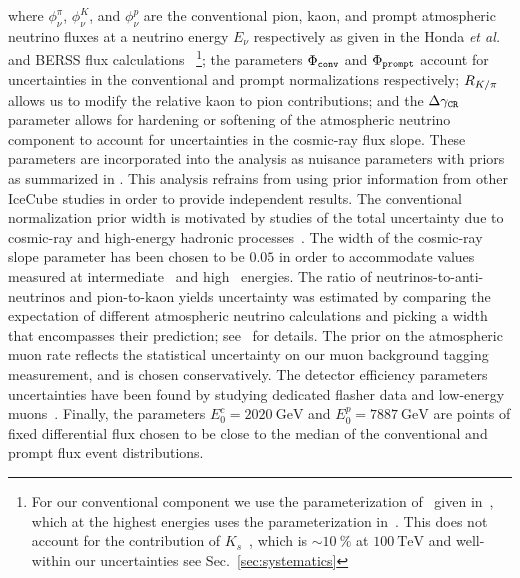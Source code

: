 where $\phi^\pi_\nu$, $\phi^K_\nu$, and $\phi^p_\nu$ are the conventional pion, kaon, and prompt atmospheric neutrino fluxes at a neutrino energy $E_\nu$ respectively as given in the Honda {\it{}et al.} and BERSS flux calculations~\cite{Honda:2006qj,Bhattacharya:2015jpa}
\footnote{For our conventional component we use the parameterization of~\cite{Honda:2006qj} given in~\cite{Montaruli:2011as}, which at the highest energies uses the parameterization in~\cite{Gaisser:2002jj}.
	This does not account for the contribution of $K_s$~\cite{Gaisser:2014pda}, which is $\sim \SI{10}\percent$ at $\SI{100}\TeV$ and well-within our uncertainties see Sec.~\ref{sec:systematics}};
the parameters $\Phi_\texttt{conv}$ and $\Phi_\texttt{prompt}$ account for uncertainties in the conventional and prompt normalizations respectively; $R_{K/\pi}$ allows us to modify the relative kaon to pion contributions; and the $\Delta\gamma_\texttt{CR}$ parameter allows for hardening or softening of the atmospheric neutrino component to account for uncertainties in the cosmic-ray flux slope.
These parameters are incorporated into the analysis as nuisance parameters with priors as summarized in .
This analysis refrains from using prior information from other IceCube studies in order to provide independent results.
The conventional normalization prior width is motivated by studies of the total uncertainty due to cosmic-ray and high-energy hadronic processes~\cite{Fedynitch:2012fs}.
The width of the cosmic-ray slope parameter has been chosen to be $0.05$ in order to accommodate values measured at intermediate~\cite{Karelin:2011zz} and high~\cite{Bartoli:2015fhw,Yoon:2017qjx,Alfaro:2017cwx} energies.
The ratio of neutrinos-to-anti-neutrinos and pion-to-kaon yields uncertainty was estimated by comparing the expectation of different atmospheric neutrino calculations and picking a width that encompasses their prediction; see~\cite{CollinFluxes,Jones:2015bya} for details.
The prior on the atmospheric muon rate reflects the statistical uncertainty on our muon background tagging measurement, and is chosen conservatively.
The detector efficiency parameters uncertainties have been found by studying dedicated flasher data and low-energy muons~\cite{Aartsen:2016nxy}.
Finally, the parameters $E_0^c=\SI{2020}\GeV$ and $E_0^p=\SI{7887}\GeV$ are points of fixed differential flux chosen to be close to the median of the conventional and prompt flux event distributions.

